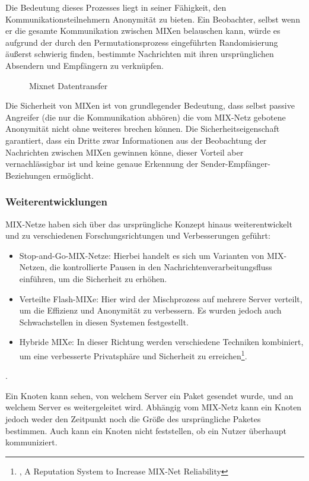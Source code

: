 Die Bedeutung dieses Prozesses liegt in seiner Fähigkeit, den Kommunikationsteilnehmern Anonymität zu bieten. Ein Beobachter, selbst wenn er die gesamte Kommunikation zwischen MIXen belauschen kann, würde es aufgrund der durch den Permutationsprozess eingeführten Randomisierung äußerst schwierig finden, bestimmte Nachrichten mit ihren ursprünglichen Absendern und Empfängern zu verknüpfen.

\begin{figure}[h!]
    \centering
    
    \caption{Mixnet Datentransfer}
    \label{imgs:mixnet_transfer}
\end{figure}

Die Sicherheit von MIXen ist von grundlegender Bedeutung, dass selbst passive Angreifer (die nur die Kommunikation abhören) die vom MIX-Netz gebotene Anonymität nicht ohne weiteres brechen können. Die Sicherheitseigenschaft garantiert, dass ein Dritte zwar Informationen aus der Beobachtung der Nachrichten zwischen MIXen gewinnen könne, dieser Vorteil aber vernachlässigbar ist und keine genaue Erkennung der Sender-Empfänger-Beziehungen ermöglicht.

\subsubsection{Weiterentwicklungen}

MIX-Netze haben sich über das ursprüngliche Konzept hinaus weiterentwickelt und zu verschiedenen Forschungsrichtungen und Verbesserungen geführt:

\begin{itemize}
    \item Stop-and-Go-MIX-Netze: Hierbei handelt es sich um Varianten von MIX-Netzen, die kontrollierte Pausen in den Nachrichtenverarbeitungsfluss einführen, um die Sicherheit zu erhöhen.
    \item Verteilte \glqq Flash-MIXe\grqq: Hier wird der Mischprozess auf mehrere Server verteilt, um die Effizienz und Anonymität zu verbessern. Es wurden jedoch auch Schwachstellen in diesen Systemen festgestellt.
    \item Hybride MIXe: In dieser Richtung werden verschiedene Techniken kombiniert, um eine verbesserte Privatsphäre und Sicherheit zu erreichen\footnote{\cite{MIXNetReliability}, A Reputation System to Increase MIX-Net Reliability}.
\end{itemize}.

Ein Knoten kann sehen, von welchem Server ein Paket gesendet wurde, und an welchem Server es weitergeleitet wird. Abhängig vom MIX-Netz kann ein Knoten jedoch weder den Zeitpunkt noch die Größe des ursprüngliche Paketes bestimmen. Auch kann ein Knoten nicht feststellen, ob ein Nutzer überhaupt kommuniziert.

